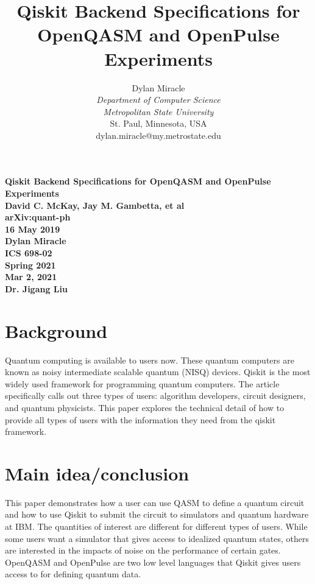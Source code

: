 \documentclass{article}
\begin{document}
\begin{titlepage}
    \begin{center}
        \vspace{4cm}
        \large
        \textbf{
            Qiskit Backend Specifications for OpenQASM and OpenPulse Experiments \\
            David C. McKay, Jay M. Gambetta, et al\\
            arXiv:quant-ph \\
            16 May 2019 \\
            Dylan Miracle \\
            ICS 698-02 \\
            Spring 2021 \\
            Mar 2, 2021 \\
            Dr. Jigang Liu
        }
    \end{center}
\end{titlepage}
\title{Qiskit Backend Specifications for OpenQASM and OpenPulse Experiments}

\author{Dylan Miracle\\
\textit{Department of Computer Science} \\
\textit{Metropolitan State University}\\
St. Paul, Minnesota, USA \\
dylan.miracle@my.metrostate.edu
}

\maketitle
\section{Background}

Quantum computing is available to users now. These quantum computers are known as noisy intermediate scalable quantum (NISQ) devices. Qiskit is the most widely used framework for programming quantum computers. The article specifically calls out three types of users: algorithm developers, circuit designers, and quantum physicists. This paper explores the technical detail of how to provide all types of users with the information they need from the qiskit framework.

\section{Main idea/conclusion}
This paper demonstrates how a user can use QASM to define a quantum circuit and how to use Qiskit to submit the circuit to simulators and quantum hardware at IBM. The quantities of interest are different for different types of users. While some users want a simulator that gives access to idealized quantum states, others are interested in the impacts of noise on the performance of certain gates. OpenQASM and OpenPulse are two low level languages that Qiskit gives users access to for defining quantum data. 
\end{document}
